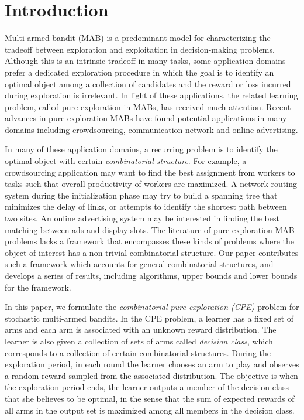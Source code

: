 \documentclass{article}
\newcommand{\Problem}{{CPE}\xspace}
\begin{document}
\begin{abstract}

\end{abstract}
\vspace{-0.5em}
\section{Introduction}
\vspace{-0.3em}
Multi-armed bandit (MAB) is a predominant model for characterizing the tradeoff between exploration and exploitation in decision-making problems. 
Although this is an intrinsic tradeoff in many tasks, some application domains prefer a dedicated exploration procedure in which the goal is to identify an optimal object among a collection of candidates and the reward or loss incurred during exploration is irrelevant.
In light of these applications, the related learning problem, called pure exploration in MABs, has received much attention.
Recent advances in pure exploration MABs have found potential applications in many domains including crowdsourcing, communication network and online advertising.

In many  of these application domains, a recurring problem is to identify the optimal object with certain \emph{combinatorial structure}. 
For example, a crowdsourcing application may want to find the best assignment from workers to tasks such that overall productivity of workers are maximized. 
A network routing system during the initialization phase may try to build a spanning tree that minimizes the delay of links, or attempts to identify the shortest path between two sites.  
An online advertising system may be interested in finding the best matching between ads and display slots. 
The literature of pure exploration MAB problems lacks a framework that encompasses these kinds of problems where the object of interest has a non-trivial combinatorial structure.  
Our paper contributes such a framework which accounts for general combinatorial structures, and develops a series of results, including algorithms, upper bounds and lower bounds for the framework.

In this paper, we formulate the {\em combinatorial pure exploration (\Problem)} problem for stochastic multi-armed bandits.  
In the \Problem problem, a learner has a fixed set of arms and each arm is associated with an unknown reward distribution. 
The learner is also given a collection of sets of arms called \emph{decision class}, which
	corresponds to  a collection of certain combinatorial structures.
During the exploration period, in each round the learner chooses an arm to play
	and observes a random reward sampled from the associated distribution. 
The objective is when the exploration period ends, the learner outputs a member of the decision
	class that she believes to be optimal, in the sense that the sum of expected rewards of all arms
	in the output set is maximized among all members in the decision class.
\end{document}
